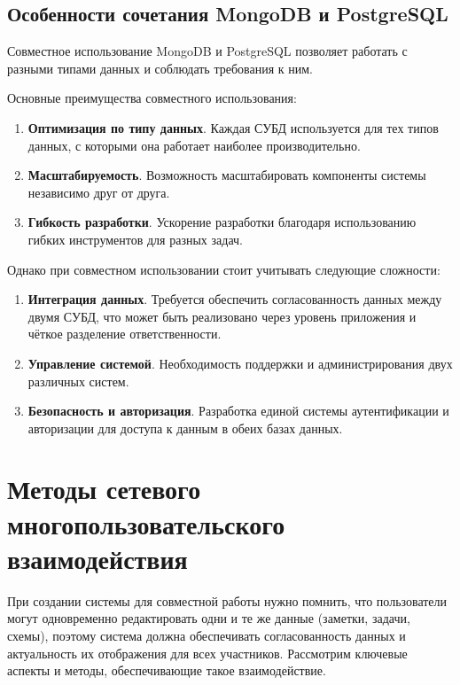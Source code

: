 \subsection{Особенности сочетания MongoDB и PostgreSQL}

Совместное использование MongoDB и PostgreSQL позволяет работать с разными типами данных и соблюдать требования к ним.

Основные преимущества совместного использования:

\begin{enumerate}[wide=12.5mm, leftmargin=12.5mm]
    \item \textbf{Оптимизация по типу данных}. Каждая СУБД используется для тех типов данных, с которыми она работает наиболее производительно.
    \item \textbf{Масштабируемость}. Возможность масштабировать компоненты системы независимо друг от друга.
    \item \textbf{Гибкость разработки}. Ускорение разработки благодаря использованию гибких инструментов для разных задач.
\end{enumerate}

Однако при совместном использовании стоит учитывать следующие сложности:

\begin{enumerate}[wide=12.5mm, leftmargin=12.5mm]
    \item \textbf{Интеграция данных}. Требуется обеспечить согласованность данных между двумя СУБД, что может быть реализовано через уровень приложения и чёткое разделение ответственности.
    \item \textbf{Управление системой}. Необходимость поддержки и администрирования двух различных систем.
    \item \textbf{Безопасность и авторизация}. Разработка единой системы аутентификации и авторизации для доступа к данным в обеих базах данных.
\end{enumerate}

\section{Методы сетевого многопользовательского взаимодействия}

При создании системы для совместной работы нужно помнить, что пользователи могут одновременно редактировать одни и те же данные (заметки, задачи, схемы), поэтому система должна обеспечивать согласованность данных и актуальность их отображения для всех участников. 
Рассмотрим ключевые аспекты и методы, обеспечивающие такое взаимодействие.

